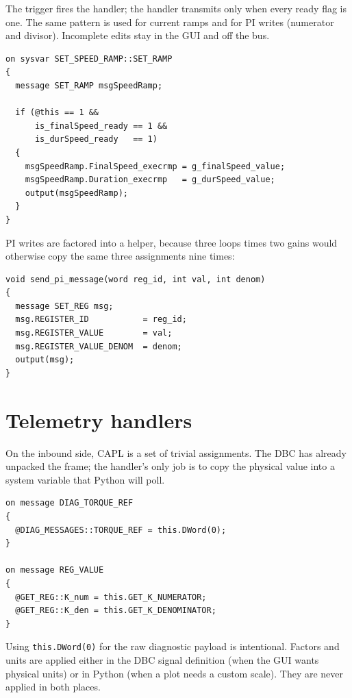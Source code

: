 The trigger fires the handler; the handler transmits only when every
ready flag is one. The same pattern is used for current ramps and for PI
writes (numerator and divisor). Incomplete edits stay in the GUI and off
the bus.

\begin{lstlisting}[style=caplstyle,caption={CAPL handler for the speed ramp, with ready-flag guard.},label=lst:capl-speed]
on sysvar SET_SPEED_RAMP::SET_RAMP
{
  message SET_RAMP msgSpeedRamp;

  if (@this == 1 &&
      is_finalSpeed_ready == 1 &&
      is_durSpeed_ready   == 1)
  {
    msgSpeedRamp.FinalSpeed_execrmp = g_finalSpeed_value;
    msgSpeedRamp.Duration_execrmp   = g_durSpeed_value;
    output(msgSpeedRamp);
  }
}
\end{lstlisting}

PI writes are factored into a helper, because three loops times two gains
would otherwise copy the same three assignments nine times:

\begin{lstlisting}[style=caplstyle,caption={CAPL helper that encodes a packed PI SET\_REG.},label=lst:capl-pi]
void send_pi_message(word reg_id, int val, int denom)
{
  message SET_REG msg;
  msg.REGISTER_ID           = reg_id;
  msg.REGISTER_VALUE        = val;
  msg.REGISTER_VALUE_DENOM  = denom;
  output(msg);
}
\end{lstlisting}

\section{Telemetry handlers}
\label{sec:tel-capl}

On the inbound side, CAPL is a set of trivial assignments. The DBC has
already unpacked the frame; the handler's only job is to copy the
physical value into a system variable that Python will poll.

\begin{lstlisting}[style=caplstyle,caption={Inbound CAPL: diagnostics and REG\_VALUE.},label=lst:capl-diag]
on message DIAG_TORQUE_REF
{
  @DIAG_MESSAGES::TORQUE_REF = this.DWord(0);
}

on message REG_VALUE
{
  @GET_REG::K_num = this.GET_K_NUMERATOR;
  @GET_REG::K_den = this.GET_K_DENOMINATOR;
}
\end{lstlisting}

Using \texttt{this.DWord(0)} for the raw diagnostic payload is
intentional. Factors and units are applied either in the DBC signal
definition (when the GUI wants physical units) or in Python (when a plot
needs a custom scale). They are never applied in both places.

